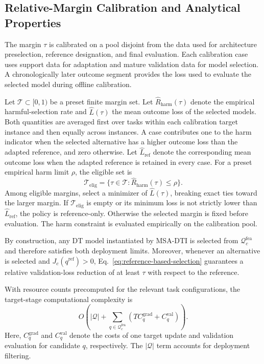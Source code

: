 \documentclass[a4paper,fleqn]{cas-sc}
\begin{document}
\subsection{Relative-Margin Calibration and Analytical Properties}

The margin $\tau$ is calibrated on a pool disjoint from the data used for
architecture preselection, reference designation, and final evaluation.
Each calibration case uses support data for adaptation and mature validation
data for model selection. A chronologically later outcome segment provides
the loss used to evaluate the selected model during offline calibration.

Let $\mathcal T\subset[0,1)$ be a preset finite margin set.
Let $\widehat R_{\mathrm{harm}}(\tau)$ denote the empirical harmful-selection
rate and $\widehat L(\tau)$ the mean outcome loss of the selected models.
Both quantities are averaged first over tasks within each calibration target
instance and then equally across instances. A case contributes one to the
harm indicator when the selected alternative has a higher outcome loss than
the adapted reference, and zero otherwise. Let $\widehat L_{\mathrm{ref}}$
denote the corresponding mean outcome loss when the adapted reference is
retained in every case. For a preset empirical harm limit $\rho$, the eligible
set is
\begin{equation}
\mathcal T_{\mathrm{elig}}=
\{\tau\in\mathcal T:\widehat R_{\mathrm{harm}}(\tau)\leq\rho\}.
\label{eq:margin-calibration}
\end{equation}
Among eligible margins, select a minimizer of $\widehat L(\tau)$, breaking
exact ties toward the larger margin. If $\mathcal T_{\mathrm{elig}}$ is empty
or its minimum loss is not strictly lower than $\widehat L_{\mathrm{ref}}$,
the policy is reference-only. Otherwise the selected margin is fixed before
evaluation. The harm constraint is evaluated empirically on the calibration
pool.

By construction, any DT model instantiated by MSA-DTI is selected from
$\mathcal{Q}_{c}^{\mathrm{fea}}$ and therefore satisfies both deployment
limits. Moreover, whenever an alternative is selected and
$J_c(q^{\mathrm{ref}})>0$, Eq.~\eqref{eq:reference-based-selection}
guarantees a relative validation-loss reduction of at least $\tau$ with
respect to the reference.

With resource counts precomputed for the relevant task configurations,
the target-stage computational complexity is
\begin{equation}
O\left(
|\mathcal{Q}|+
\sum_{q\in\mathcal{Q}_{c}^{\mathrm{fea}}}
\left(TC_q^{\mathrm{grad}}+C_q^{\mathrm{val}}\right)
\right).
\label{eq:target-complexity}
\end{equation}
Here, $C_q^{\mathrm{grad}}$ and $C_q^{\mathrm{val}}$ denote the costs of one
target update and validation evaluation for candidate $q$, respectively. The
$|\mathcal{Q}|$ term accounts for deployment filtering.
\end{document}
